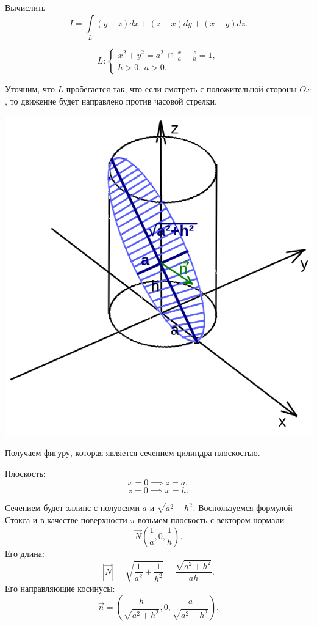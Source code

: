 \documentclass[../../main.tex]{subfiles}
\begin{document}
			
			\begin{example}
				Вычислить
				\[ I = \int \limits_L \left( y-z \right) dx + \left( z-x \right) dy + \left( x-y \right) dz.  \]
				
				\[ L: \begin{cases}
					x^2 + y^2 = a^2\ \cap\ \frac{x}{a} + \frac{z}{h} = 1, \\
					h > 0,\ a > 0.
				   \end{cases}
				 \]
				
			Уточним, что $L$ пробегается так, что если смотреть с положительной стороны $Ox$, то движение будет направлено против часовой стрелки.
			
			\begin{center}
			 \includegraphics[scale=0.75]{lec25-cylinder}
			\end{center}
			
			Получаем фигуру, которая является сечением цилиндра плоскостью.
			
			Плоскость: 
			\[x = 0 \implies z = a,\]
			\[z = 0 \implies x = h.\]
			
			Сечением будет эллипс с полуосями $a$ и $\sqrt{a^2 + h^2}$. Воспользуемся формулой Стокса и в качестве поверхности $\pi$ возьмем плоскость с вектором нормали
			\[ \vec{N}\left( \frac{1}{a}, 0 , \frac{1}{h} \right). \]
			Его длина:
			\[ \left| \vec{N} \right|= \sqrt{\frac{1}{a^2} + \frac{1}{h^2} } = \frac{\sqrt{a^2 + h^2}}{ah}.  \]
			Его направляющие косинусы:
			\[ \vec{n} = \left( \frac{h}{\sqrt{a^2 + h^2}}, 0, \frac{a}{\sqrt{a^2 + h^2}} \right). \]
			

\end{example}
\end{document}
